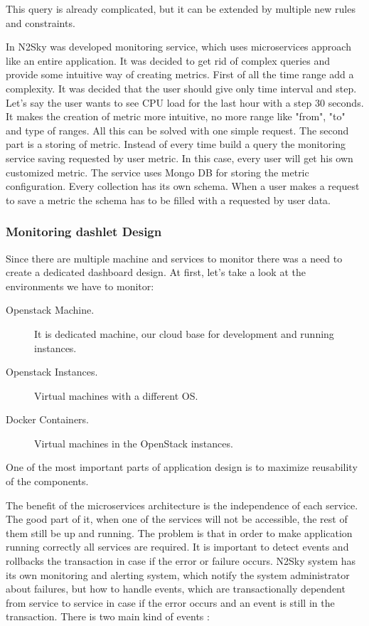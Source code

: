 This query is already complicated, but it can be extended by multiple new rules and constraints. 

In N2Sky was developed monitoring service, which uses microservices approach like an entire application. It was decided to get rid of complex queries and provide some intuitive way of creating metrics. 
First of all the time range add a complexity. It was decided that the user should give only time interval and step. Let's say the user wants to see CPU load for the last hour with a step 30 seconds. It makes the creation of metric more intuitive, no more range like "from", "to" and type of ranges. All this can be solved with one simple request. 
The second part is a storing of metric. Instead of every time build a query the monitoring service saving requested by user metric. In this case, every user will get his own customized metric. 
The service uses Mongo DB for storing the metric configuration. Every collection has its own schema. When a user makes a request to save a metric the schema has to be filled with a requested by user data.

\subsubsection{Monitoring dashlet Design}\label{Monitoring dashlet Design}

Since there are multiple machine and services to monitor there was a need to create a dedicated dashboard design.  At first, let's take a look at the environments we have to monitor: 
\begin{description}
\item[Openstack Machine.]  It is dedicated machine, our cloud base for development and running instances.
\item[Openstack Instances.]   Virtual machines with a different OS.
\item[Docker Containers.]  Virtual machines in the OpenStack instances.
\end{description}

One of the most important parts of application design is to maximize reusability of the components. 


The benefit of the microservices architecture is the independence of each service. The good part of it, when one of the services will not be accessible, the rest of them still be up and running. The problem is that in order to make application running correctly all services are required. It is important to detect events and rollbacks the transaction in case if the error or failure occurs. N2Sky system has its own monitoring and alerting system, which notify the system administrator about failures, but how to handle events, which are transactionally dependent from service to service in case if the error occurs and an event is still in the transaction. There is two main kind of events \cite{cs5366}: 

